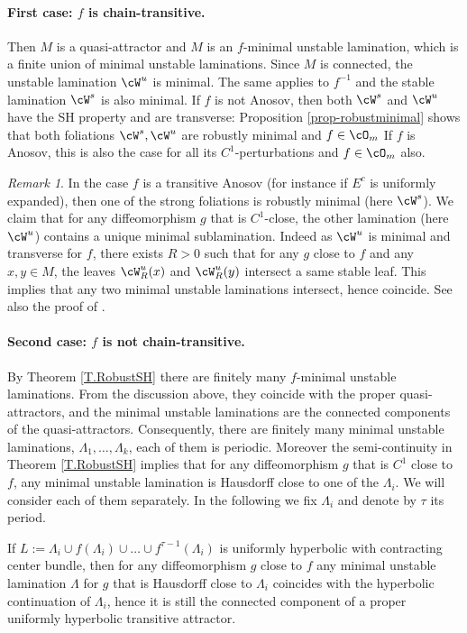 \documentclass[a4paper,11pt]{amsart}
\numberwithin{equation}{section}     %
\theoremstyle{definition}
\theoremstyle{remark}
\newtheorem{obs}[teo]{Remark}
\begin{document}
\paragraph{\bf First case: $f$ is chain-transitive.}
Then $M$ is a quasi-attractor and $M$ is an $f$-minimal unstable lamination, which is a finite union of minimal unstable laminations. Since $M$ is connected, the unstable lamination $\cW^u$ is minimal. The same applies to $f^{-1}$ and the stable lamination $\cW^s$ is also minimal.
If $f$ is not Anosov, then both $\cW^s$ and $\cW^u$ have the SH property and are transverse:
Proposition \ref{prop-robustminimal} shows that both foliations $\cW^s,\cW^u$ are robustly minimal
and $f \in \cO_m$
If $f$ is Anosov, this is also the case for all its $C^1$-perturbations and $f \in \cO_m$ also.

\begin{obs}\label{r.uniqueness-minimal}
In the case $f$ is a transitive Anosov (for instance if $E^c$ is uniformly expanded), then one of the strong foliations is robustly minimal (here $\cW^s$). We claim that for any diffeomorphism $g$ that is $C^1$-close, the other lamination (here $\cW^u$) contains a unique minimal sublamination. Indeed as $\cW^u$ is minimal and transverse for $f$, there exists $R>0$ such that for any $g$ close to $f$ and any $x,y\in M$, the leaves $\cW^u_R(x)$ and $\cW^u_R(y)$ intersect a same stable leaf. This implies that any two minimal unstable laminations intersect, hence coincide.
See also the proof of \cite[Proposition 1.5]{ACW}.
\end{obs}

\paragraph{\bf Second case: $f$ is not chain-transitive.}
By Theorem \ref{T.RobustSH} there are finitely many $f$-minimal unstable laminations.
From the discussion above, they coincide with the proper quasi-attractors, and the minimal unstable laminations are the connected components of the quasi-attractors. Consequently, there are finitely many minimal unstable laminations, 
$\Lambda_1,\dots,\Lambda_k$, each of them is periodic. Moreover the semi-continuity in Theorem \ref{T.RobustSH}
implies that for any diffeomorphism $g$ that is $C^1$ close to $f$, any minimal unstable lamination is Hausdorff close to one of the $\Lambda_i$.
We will consider each of them separately. In the following we fix $\Lambda_i$ and denote by $\tau$ its period.

If $L:=\Lambda_i\cup f(\Lambda_i)\cup \dots\cup f^{\tau-1}(\Lambda_i)$ is uniformly hyperbolic with contracting center bundle, then for any diffeomorphism $g$ close to $f$ any minimal unstable lamination $\Lambda$ for $g$ that is Hausdorff close to $\Lambda_i$ coincides with the hyperbolic continuation of $\Lambda_i$, hence it is still the connected component of a proper uniformly hyperbolic transitive attractor.
\end{document}
